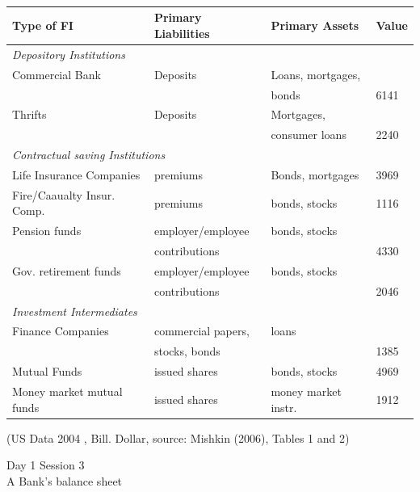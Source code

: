 \documentclass[11pt]{beamer}
\begin{document}
\begin{frame}
\frametitle{\insertsection}

\footnotesize
\hskip 0.5cm
\begin{tabular}{llll}
\hline
\textbf{Type of FI} & \textbf{Primary Liabilities} & \textbf{Primary Assets} & \textbf{Value}\\
\hline
\textit{Depository Institutions} & & & \\
\hline
Commercial Bank & Deposits & Loans, mortgages, & \\
                &          & bonds              & 6141 \\
Thrifts          & Deposits & Mortgages, & \\
                &          & consumer loans     & 2240\\
\hline
\multicolumn{2}{l}{\textit{Contractual saving Institutions}} & & \\
\hline
Life Insurance Companies & premiums & Bonds, mortgages & 3969\\
Fire/Caaualty Insur. Comp. & premiums & bonds, stocks & 1116\\
Pension funds & employer/employee & bonds, stocks & \\
              & contributions & & 4330\\
Gov. retirement funds & employer/employee & bonds, stocks & \\
              & contributions & & 2046\\
\hline
\textit{Investment Intermediates} & & & \\
\hline
Finance Companies & commercial papers, & loans & \\
                  & stocks, bonds & & 1385 \\
Mutual Funds & issued shares & bonds, stocks & 4969\\
Money market mutual funds & issued shares & money market instr. & 1912\\
\hline
\end{tabular}
\par
{\tiny (US Data 2004 , Bill. Dollar, source: Mishkin (2006), Tables 1 and 2)}
\end{frame}
%






\begin{frame}
\begin{center}
 Day 1 Session 3 \\
 A Bank's balance sheet
\end{center}
\end{frame}
\end{document}
